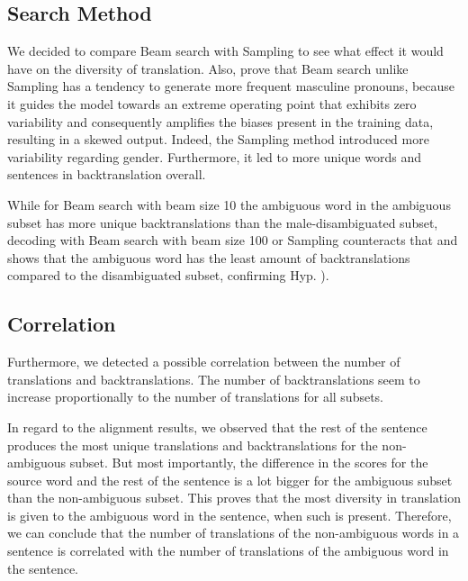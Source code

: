 \subsection{Search Method} %

We decided to compare Beam search with Sampling to see what effect it would have on the diversity of translation. Also, \citet{roberts2020decoding} prove that Beam search unlike Sampling has a tendency to generate more frequent masculine pronouns, because it guides the model towards an extreme operating point that exhibits zero variability and consequently amplifies the biases present in the training data, resulting in a skewed output. Indeed, the Sampling method introduced more variability regarding gender. Furthermore, it led to more unique words and sentences in backtranslation overall. 

While for Beam search with beam size 10 the ambiguous word in the ambiguous subset has more unique backtranslations than the male-disambiguated subset, decoding with Beam search with beam size 100 or Sampling counteracts that and shows that the ambiguous word has the least amount of backtranslations compared to the disambiguated subset, confirming Hyp. ).


\subsection{Correlation} 

Furthermore, we detected a possible correlation between the number of translations and backtranslations. The number of backtranslations seem to increase proportionally to the number of translations for all subsets.

In regard to the alignment results, we observed that the rest of the sentence produces the most unique translations and backtranslations for the non-ambiguous subset. But most importantly, the difference in the scores for the source word and the rest of the sentence is a lot bigger for the ambiguous subset than the non-ambiguous subset. This proves that the most diversity in translation is given to the ambiguous word in the sentence, when such is present. Therefore, we can conclude that the number of translations of the non-ambiguous words in a sentence is correlated with the number of translations of the ambiguous word in the sentence.



